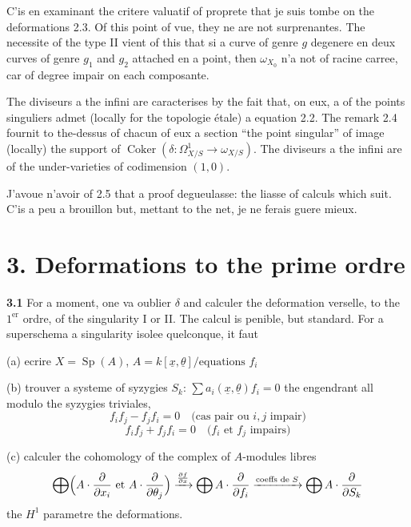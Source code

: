 \documentclass[11pt,a4paper]{article}
\theoremstyle{plain}
\theoremstyle{definition}
\DeclareMathOperator{\Coker}{Coker}
\DeclareMathOperator{\Sp}{Sp}
\begin{document}
C'is en examinant the critere valuatif of proprete that je suis tombe on the deformations 2.3. Of this point of vue, they ne are not surprenantes. The necessite of the type II vient of this that si a curve of genre $g$ degenere en deux curves of genre $g_1$ and $g_2$ attached en a point, then $\omega_{X_0}$ n'a not of racine carree, car of degree impair on each composante.

The diviseurs a the infini are caracterises by the fait that, on eux, a of the points singuliers admet (locally for the topologie étale) a equation 2.2. The remark 2.4 fournit to the-dessus of chacun of eux a section ``the point singular'' of image (locally) the support of $\Coker(\delta : \Omega^1_{X/S} \to \omega_{X/S})$. The diviseurs a the infini are of the under-varieties of codimension $(1,0)$.

J'avoue n'avoir of 2.5 that a proof degueulasse: the liasse of calculs which suit. C'is a peu a brouillon but, mettant to the net, je ne ferais guere mieux.

\newpage

\section*{3. Deformations to the prime ordre}

\noindent \textbf{3.1} For a moment, one va oublier $\delta$ and calculer the deformation verselle, to the $1^{\text{er}}$ ordre, of the singularity I or II. The calcul is penible, but standard. For a superschema a singularity isolee quelconque, it faut

(a) ecrire $X = \Sp(A)$, $A = k[\underline{x}, \underline{\theta}] / \text{equations } f_i$

(b) trouver a systeme of syzygies $S_k$: $\sum a_i(\underline{x},\underline{\theta}) f_i = 0$ the engendrant all modulo the syzygies triviales,
\[
f_i f_j - f_j f_i = 0 \quad \text{(cas pair ou $i,j$ impair)}
\]
\[
f_i f_j + f_j f_i = 0 \quad \text{($f_i$ et $f_j$ impairs)}
\]

(c) calculer the cohomology of the complex of $A$-modules libres
\[
\bigoplus \Bigl(A \cdot \frac{\partial}{\partial x_i} \text{ et } A \cdot \frac{\partial}{\partial \theta_j}\Bigr) \xrightarrow{\frac{\partial f}{\partial x}} \bigoplus A \cdot \frac{\partial}{\partial f_i} \xrightarrow{\text{coeffs de } S} \bigoplus A \cdot \frac{\partial}{\partial S_k}
\]
the $H^1$ parametre the deformations.
\end{document}
